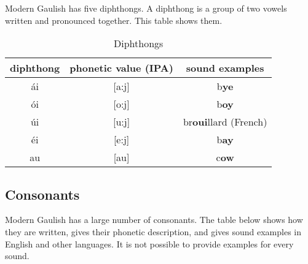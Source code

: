 \noindent Modern Gaulish has five diphthongs. A diphthong is a group of two vowels written and pronounced together. This table shows them.

\begin{table}[H]
\begin{center}
\begin{tabu}{c|c|c}
  \textbf{diphthong} & \textbf{phonetic value (IPA)} & \textbf{sound examples}\\
  \toprule
  \'{a}i & [a:j] & b\textbf{ye}\\
  \'{o}i & [o:j] & b\textbf{oy}\\
  \'{u}i & [u:j] & br\textbf{oui}llard (French)\\
  \'{e}i & [e:j] & b\textbf{ay}\\
  au & [au] & c\textbf{ow}\\
\end{tabu}
\end{center}
\caption{Diphthongs}
\label{phonology_diphthongs}
\end{table}

\subsection{Consonants}

\noindent Modern Gaulish has a large number of consonants. The table below shows how they are written, gives their phonetic description, and gives sound examples in English and other languages. It is not possible to provide examples for every sound.

